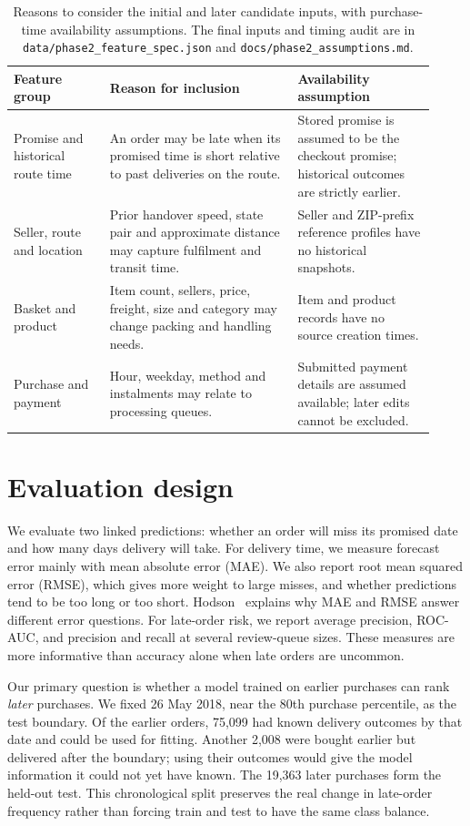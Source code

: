 \documentclass[12pt,a4paper]{article}
\begin{document}
\begin{table}[h]
\centering\small
\caption{Reasons to consider the initial and later candidate inputs, with purchase-time availability assumptions. The final inputs and timing audit are in \texttt{data/phase2\_feature\_spec.json} and \texttt{docs/phase2\_assumptions.md}.}
\label{tab:feature-rationale}
\begin{tabular}{@{}p{0.21\linewidth}p{0.41\linewidth}p{0.30\linewidth}@{}}
\toprule
Feature group & Reason for inclusion & Availability assumption \\
\midrule
Promise and historical route time & An order may be late when its promised time is short relative to past deliveries on the route. & Stored promise is assumed to be the checkout promise; historical outcomes are strictly earlier. \\
Seller, route and location & Prior handover speed, state pair and approximate distance may capture fulfilment and transit time. & Seller and ZIP-prefix reference profiles have no historical snapshots. \\
Basket and product & Item count, sellers, price, freight, size and category may change packing and handling needs. & Item and product records have no source creation times. \\
Purchase and payment & Hour, weekday, method and instalments may relate to processing queues. & Submitted payment details are assumed available; later edits cannot be excluded. \\
\bottomrule
\end{tabular}
\end{table}

\section*{Evaluation design}
We evaluate two linked predictions: whether an order will miss its promised date and how many days delivery will take. For delivery time, we measure forecast error mainly with mean absolute error (MAE). We also report root mean squared error (RMSE), which gives more weight to large misses, and whether predictions tend to be too long or too short. Hodson~\cite{hodson2022} explains why MAE and RMSE answer different error questions. For late-order risk, we report average precision, ROC-AUC, and precision and recall at several review-queue sizes. These measures are more informative than accuracy alone when late orders are uncommon.

Our primary question is whether a model trained on earlier purchases can rank \emph{later} purchases. We fixed 26 May 2018, near the 80th purchase percentile, as the test boundary. Of the earlier orders, 75,099 had known delivery outcomes by that date and could be used for fitting. Another 2,008 were bought earlier but delivered after the boundary; using their outcomes would give the model information it could not yet have known. The 19,363 later purchases form the held-out test. This chronological split preserves the real change in late-order frequency rather than forcing train and test to have the same class balance.
\end{document}
